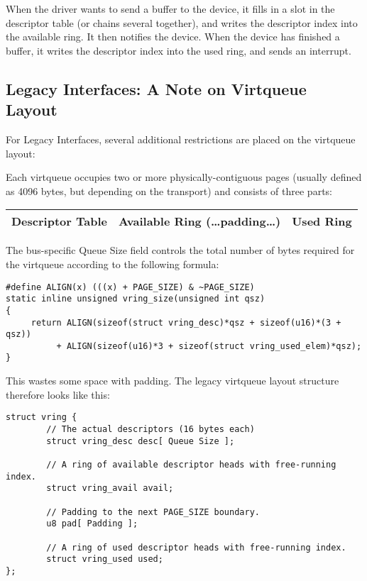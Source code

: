 When the driver wants to send a buffer to the device, it fills in
a slot in the descriptor table (or chains several together), and
writes the descriptor index into the available ring.  It then
notifies the device. When the device has finished a buffer, it
writes the descriptor index into the used ring, and sends an interrupt.


\subsection{Legacy Interfaces: A Note on Virtqueue Layout}\label{sec:Basic Facilities of a Virtio Device / Virtqueues / Legacy Interfaces: A Note on Virtqueue Layout}

For Legacy Interfaces, several additional
restrictions are placed on the virtqueue layout:

Each virtqueue occupies two or more physically-contiguous pages
(usually defined as 4096 bytes, but depending on the transport)
and consists of three parts:

\begin{tabular}{|l|l|l|}
\hline
Descriptor Table & Available Ring (\ldots padding\ldots) & Used Ring \\
\hline
\end{tabular}

The bus-specific Queue Size field controls the total number of bytes
required for the virtqueue according to the following formula:

\begin{lstlisting}
#define ALIGN(x) (((x) + PAGE_SIZE) & ~PAGE_SIZE)
static inline unsigned vring_size(unsigned int qsz)
{
     return ALIGN(sizeof(struct vring_desc)*qsz + sizeof(u16)*(3 + qsz))
          + ALIGN(sizeof(u16)*3 + sizeof(struct vring_used_elem)*qsz);
}
\end{lstlisting}

This wastes some space with padding.
The legacy virtqueue layout structure therefore looks like this:

\begin{lstlisting}
struct vring {
        // The actual descriptors (16 bytes each)
        struct vring_desc desc[ Queue Size ];

        // A ring of available descriptor heads with free-running index.
        struct vring_avail avail;

        // Padding to the next PAGE_SIZE boundary.
        u8 pad[ Padding ];

        // A ring of used descriptor heads with free-running index.
        struct vring_used used;
};
\end{lstlisting}

